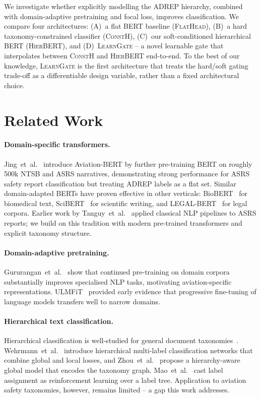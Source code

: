 \documentclass{article}
\newcommand{\modA}{\textsc{FlatHead}}
\newcommand{\modB}{\textsc{ConstH}}
\newcommand{\modC}{\textsc{HierBERT}}
\newcommand{\modD}{\textsc{LearnGate}}
\begin{document}
We investigate whether explicitly modelling the ADREP hierarchy,
combined with domain-adaptive pretraining and focal loss, improves
classification.  We compare four architectures:
(A)~a flat BERT baseline (\modA),
(B)~a hard taxonomy-constrained classifier (\modB),
(C)~our soft-conditioned hierarchical BERT (\modC), and
(D)~\modD{} -- a novel learnable gate that interpolates between
\modB{} and \modC{} end-to-end.
To the best of our knowledge, \modD{} is the first architecture that
treats the hard/soft gating trade-off as a differentiable design
variable, rather than a fixed architectural choice.

\section{Related Work}

\paragraph{Domain-specific transformers.}
Jing~et~al.~\cite{jing2023bert} introduce Aviation-BERT by further
pre-training BERT on roughly 500k NTSB and ASRS narratives,
demonstrating strong performance for ASRS safety report classification
but treating ADREP labels as a flat set.
Similar domain-adapted BERTs have proven effective in other verticals:
BioBERT~\cite{lee2020biobert} for biomedical text,
SciBERT~\cite{beltagy2019scibert} for scientific writing, and
LEGAL-BERT~\cite{chalkidis2020legalbert} for legal corpora.
Earlier work by Tanguy~et~al.~\cite{tanguy2016natural} applied classical
NLP pipelines to ASRS reports; we build on this tradition with modern
pre-trained transformers and explicit taxonomy structure.

\paragraph{Domain-adaptive pretraining.}
Gururangan~et~al.~\cite{gururangan2020dont} show that continued
pre-training on domain corpora substantially improves specialised NLP
tasks, motivating aviation-specific representations.
ULMFiT~\cite{howard2018ulmfit} provided early evidence that progressive
fine-tuning of language models transfers well to narrow domains.

\paragraph{Hierarchical text classification.}
Hierarchical classification is well-studied for general document
taxonomies~\cite{silla2011survey}.
Wehrmann~et~al.~\cite{wehrmann2018hierarchical} introduce hierarchical
multi-label classification networks that combine global and local losses,
and Zhou~et~al.~\cite{zhou2020hierarchical} propose a hierarchy-aware
global model that encodes the taxonomy graph.
Mao~et~al.~\cite{mao2019hier} cast label assignment as reinforcement
learning over a label tree.
Application to aviation safety taxonomies, however, remains limited --
a gap this work addresses.
\end{document}
